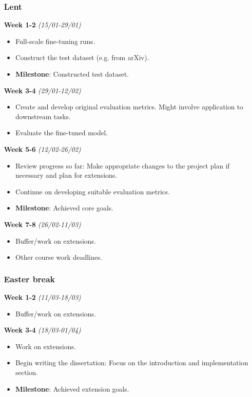 \subsubsection*{Lent}
\textbf{Week 1-2} \emph{(15/01-29/01)}
\begin{itemize}
    \item Full-scale fine-tuning runs.
    \item Construct the test dataset (e.g. from arXiv).
    \item \textbf{Milestone}: Constructed test dataset.
\end{itemize}

\textbf{Week 3-4} \emph{(29/01-12/02)}
\begin{itemize}
    \item Create and develop original evaluation metrics. Might involve application to downstream tasks.
    \item Evaluate the fine-tuned model.
\end{itemize}

\textbf{Week 5-6} \emph{(12/02-26/02)}
\begin{itemize}
    \item Review progress so far: Make appropriate changes to the project plan if necessary and plan for extensions.
    \item Continue on developing suitable evaluation metrics.
    \item \textbf{Milestone}: Achieved core goals.
\end{itemize}

\textbf{Week 7-8} \emph{(26/02-11/03)}
\begin{itemize}
    \item Buffer/work on extensions.
    \item Other course work deadlines.
\end{itemize}

\subsubsection*{Easter break}
\textbf{Week 1-2} \emph{(11/03-18/03)}
\begin{itemize}
    \item Buffer/work on extensions.
\end{itemize}

\textbf{Week 3-4} \emph{(18/03-01/04)}
\begin{itemize}
    \item Work on extensions.
    \item Begin writing the dissertation: Focus on the introduction and implementation section.
    \item \textbf{Milestone}: Achieved extension goals.
\end{itemize}

